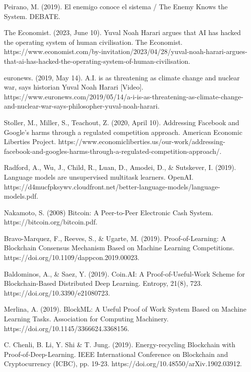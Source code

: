 \documentclass[conference]{IEEEtran}
\begin{document}
\begin{thebibliography}{00}

 Peirano, M. (2019). El enemigo conoce el sistema / The Enemy Knows the System. DEBATE.

 The Economist. (2023, June 10). Yuval Noah Harari argues that AI has hacked the operating system of human civilisation. The Economist. https://www.economist.com/by-invitation/2023/04/28/yuval-noah-harari-argues-that-ai-has-hacked-the-operating-system-of-human-civilisation.

 euronews. (2019, May 14). A.I. is as threatening as climate change and nuclear war, says historian Yuval Noah Harari [Video]. https://www.euronews.com/2019/05/14/a-i-is-as-threatening-as-climate-change-and-nuclear-war-says-philosopher-yuval-noah-harari.

 Stoller, M., Miller, S., Teachout, Z. (2020, April 10). Addressing Facebook and Google’s harms through a regulated competition approach. American Economic Liberties Project. https://www.economicliberties.us/our-work/addressing-facebook-and-googles-harms-through-a-regulated-competition-approach/.

 Radford, A., Wu, J., Child, R., Luan, D., Amodei, D., \& Sutskever, I. (2019). Language models are unsupervised multitask learners. OpenAI. https://d4mucfpksywv.cloudfront.net/better-language-models/language-models.pdf.

 Nakamoto, S. (2008) Bitcoin: A Peer-to-Peer Electronic Cash System. https://bitcoin.org/bitcoin.pdf.

 Bravo-Marquez, F., Reeves, S., \& Ugarte, M. (2019). Proof-of-Learning: A Blockchain Consensus Mechanism Based on Machine Learning Competitions. https://doi.org/10.1109/dappcon.2019.00023.

 Baldominos, A., \& Saez, Y. (2019). Coin.AI: A Proof-of-Useful-Work Scheme for Blockchain-Based Distributed Deep Learning. Entropy, 21(8), 723. https://doi.org/10.3390/e21080723.

 Merlina, A. (2019). BlockML: A Useful Proof of Work System Based on Machine Learning Tasks. Association for Computing Machinery. https://doi.org/10.1145/3366624.3368156.

 C. Chenli, B. Li, Y. Shi \& T. Jung. (2019). Energy-recycling Blockchain with Proof-of-Deep-Learning. IEEE International Conference on Blockchain and Cryptocurrency (ICBC), pp. 19-23. https://doi.org/10.48550/arXiv.1902.03912.


\end{thebibliography}
\end{document}

